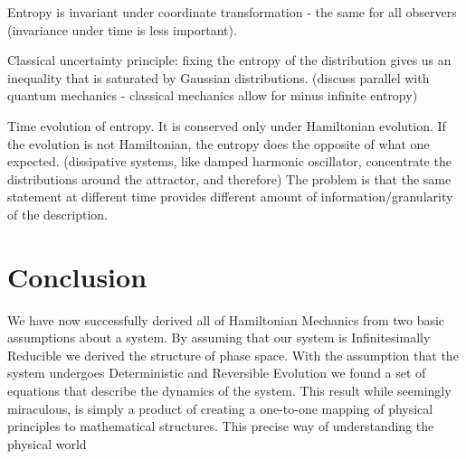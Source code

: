 \documentclass{article}[a4paper]
\begin{document}
Entropy is invariant under coordinate transformation - the same for all observers (invariance under time is less important).

Classical uncertainty principle: fixing the entropy of the distribution gives us an inequality that is saturated by Gaussian distributions. (discuss parallel with quantum mechanics - classical mechanics allow for minus infinite entropy)

Time evolution of entropy. It is conserved only under Hamiltonian evolution. If the evolution is not Hamiltonian, the entropy does the opposite of what one expected. (dissipative systems, like damped harmonic oscillator, concentrate the distributions around the attractor, and therefore) The problem is that the same statement at different time provides different amount of information/granularity of the description.
\fi

\section{Conclusion}
	
	We have now successfully derived all of Hamiltonian Mechanics from two basic assumptions about a system. By assuming that our system is Infinitesimally Reducible we derived the structure of phase space. With the assumption that the system undergoes Deterministic and Reversible Evolution we found a set of equations that describe the dynamics of the system. This result  while seemingly miraculous, is simply a product of creating a one-to-one mapping of physical principles to mathematical structures. This precise way of understanding the physical world 
	





\end{document}
